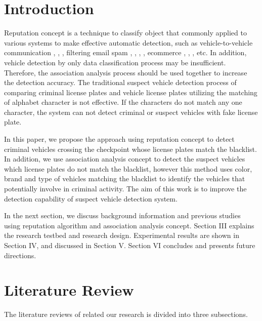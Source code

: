 \documentclass{llncs}
\begin{document}
\section{Introduction}
Reputation concept is a technique to classify object that commonly applied to various systems to make effective automatic detection, such as vehicle-to-vehicle communication \cite{QinLi}, \cite{Dhurandher}, \cite{Ayday}, filtering email spam \cite{Xie}, \cite{Chirita:Mailrank}, \cite{West:Spam}, \cite{Zhang:Ipgrouprep}, ecommerce \cite{altman}, \cite{page}, \cite{WangLin}, etc.
In addition, vehicle detection by only data classification process may be insufficient. Therefore, the association analysis process should be used together to increase the detection accuracy.
The traditional suspect vehicle detection process of comparing criminal license plates and vehicle license plates utilizing the matching of alphabet character is not effective. If the characters do not match any one character, the system can not detect criminal or suspect vehicles with fake
license plate.

In this paper, we propose the approach using reputation concept to detect criminal vehicles crossing the checkpoint whose license plates match the blacklist. 
In addition, we use association analysis concept to detect the suspect vehicles which license plates do not match the blacklist, however this method uses color, brand and type of vehicles matching the blacklist to identify the vehicles that potentially involve in criminal activity.
The aim of this work is to improve the detection capability of suspect vehicle detection system.

In the next section, we discuss background information and previous studies using reputation algorithm and association analysis concept. Section III explains the research testbed and research design. Experimental results are shown in Section IV, and discussed in Section V. Section VI concludes and presents future directions.
%
\section{Literature Review}
%
The literature reviews of related our research is divided into three subsections.
\end{document}
